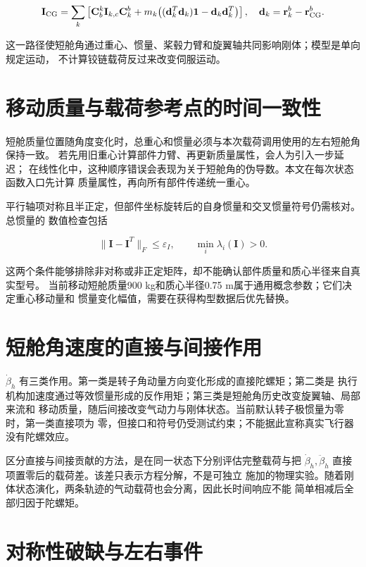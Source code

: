 \documentclass[UTF8,12pt,oneside,openany,fontset=windows]{ctexbook}
\begin{document}
\begin{equation}
\mathbf I_{\rm CG}=\sum_k\left[
\mathbf C_b^k\mathbf I_{k,c}\mathbf C_k^b
+m_k\big((\mathbf d_k^T\mathbf d_k)\mathbf 1-\mathbf d_k\mathbf d_k^T\big)
\right],
\quad \mathbf d_k=\mathbf r_k^b-\mathbf r_{\rm CG}^b.
\end{equation}

这一路径使短舱角通过重心、惯量、桨毂力臂和旋翼轴共同影响刚体；模型是单向规定运动， 不计算铰链载荷反过来改变伺服运动。

\section{移动质量与载荷参考点的时间一致性}

短舱质量位置随角度变化时，总重心和惯量必须与本次载荷调用使用的左右短舱角保持一致。 若先用旧重心计算部件力臂、再更新质量属性，会人为引入一步延迟； 在线性化中，这种顺序错误会表现为关于短舱角的伪导数。本文在每次状态函数入口先计算 质量属性，再向所有部件传递统一重心。

平行轴项对称且半正定，但部件坐标旋转后的自身惯量和交叉惯量符号仍需核对。总惯量的 数值检查包括

\begin{equation}
\|\mathbf I-\mathbf I^T\|_F\le\varepsilon_I,\qquad
\min_i\lambda_i(\mathbf I)>0.
\end{equation}

这两个条件能够排除非对称或非正定矩阵，却不能确认部件质量和质心半径来自真实型号。 当前移动短舱质量900 kg和质心半径0.75 m属于通用概念参数；它们决定重心移动量和 惯量变化幅值，需要在获得构型数据后优先替换。

\section{短舱角速度的直接与间接作用}

\(\dot\beta_h\) 有三类作用。第一类是转子角动量方向变化形成的直接陀螺矩；第二类是 执行机构加速度通过等效惯量形成的反作用矩；第三类是短舱角历史改变旋翼轴、局部来流和 移动质量，随后间接改变气动力与刚体状态。当前默认转子极惯量为零时，第一类直接项为 零，但接口和符号仍受测试约束；不能据此宣称真实飞行器没有陀螺效应。

区分直接与间接贡献的方法，是在同一状态下分别评估完整载荷与把 \(\dot\beta_h,\ddot\beta_h\) 直接项置零后的载荷差。该差只表示方程分解，不是可独立 施加的物理实验。随着刚体状态演化，两条轨迹的气动载荷也会分离，因此长时间响应不能 简单相减后全部归因于陀螺矩。

\section{对称性破缺与左右事件}
\end{document}
